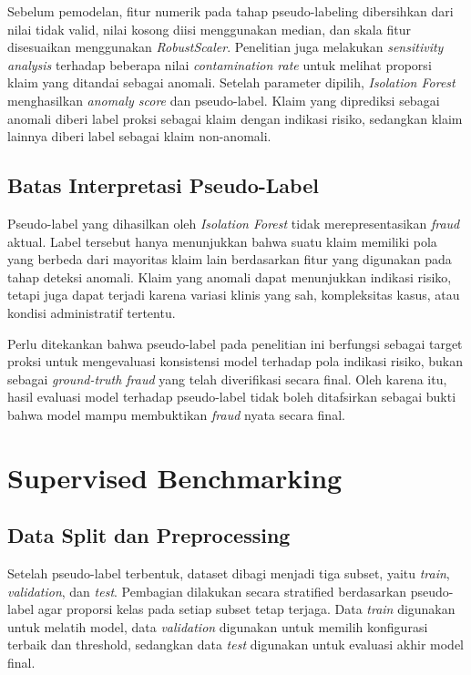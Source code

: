 Sebelum pemodelan, fitur numerik pada tahap pseudo-labeling dibersihkan dari nilai tidak valid, nilai kosong diisi menggunakan median, dan skala fitur disesuaikan menggunakan \emph{RobustScaler}. Penelitian juga melakukan \emph{sensitivity analysis} terhadap beberapa nilai \emph{contamination rate} untuk melihat proporsi klaim yang ditandai sebagai anomali. Setelah parameter dipilih, \emph{Isolation Forest} menghasilkan \emph{anomaly score} dan pseudo-label. Klaim yang diprediksi sebagai anomali diberi label proksi sebagai klaim dengan indikasi risiko, sedangkan klaim lainnya diberi label sebagai klaim non-anomali.

\subsection{Batas Interpretasi Pseudo-Label}\label{batas-interpretasi-pseudo-label}

Pseudo-label yang dihasilkan oleh \emph{Isolation Forest} tidak merepresentasikan \emph{fraud} aktual. Label tersebut hanya menunjukkan bahwa suatu klaim memiliki pola yang berbeda dari mayoritas klaim lain berdasarkan fitur yang digunakan pada tahap deteksi anomali. Klaim yang anomali dapat menunjukkan indikasi risiko, tetapi juga dapat terjadi karena variasi klinis yang sah, kompleksitas kasus, atau kondisi administratif tertentu.

Perlu ditekankan bahwa pseudo-label pada penelitian ini berfungsi sebagai target proksi untuk mengevaluasi konsistensi model terhadap pola indikasi risiko, bukan sebagai \emph{ground-truth fraud} yang telah diverifikasi secara final. Oleh karena itu, hasil evaluasi model terhadap pseudo-label tidak boleh ditafsirkan sebagai bukti bahwa model mampu membuktikan \emph{fraud} nyata secara final.

\section{Supervised Benchmarking}\label{supervised-benchmarking}

\subsection{Data Split dan Preprocessing}\label{data-split-dan-preprocessing}

Setelah pseudo-label terbentuk, dataset dibagi menjadi tiga subset, yaitu \emph{train}, \emph{validation}, dan \emph{test}. Pembagian dilakukan secara stratified berdasarkan pseudo-label agar proporsi kelas pada setiap subset tetap terjaga. Data \emph{train} digunakan untuk melatih model, data \emph{validation} digunakan untuk memilih konfigurasi terbaik dan threshold, sedangkan data \emph{test} digunakan untuk evaluasi akhir model final.

